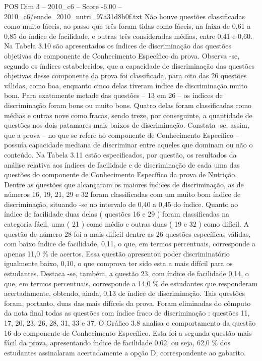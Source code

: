 \begin{textsample}{POS Dim 3 – 2010\_c6 – Score -6.00 – 2010\_c6/enade\_2010\_nutri\_97a31d8b0f.txt}
Não houve questões classificadas como muito fáceis, ao passo que três foram tidas como fáceis, na faixa de 0,61 a 0,85 do índice de facilidade, e outras três consideradas médias, entre 0,41 e 0,60.
Na Tabela 3.10 são apresentados os índices de discriminação das questões objetivas do componente de Conhecimento Específico da prova.
Observa -se, segundo os índices estabelecidos, que a capacidade de discriminação das questões objetivas desse componente da prova foi classificada, para oito das 26 questões válidas, como boa, enquanto cinco delas tiveram índice de discriminação muito bom.
Para exatamente metade das questões – 13 em 26 – os índices de discriminação foram bons ou muito bons.
Quatro delas foram classificadas como médias e outras nove como fracas, sendo treze, por conseguinte, a quantidade de questões nos dois patamares mais baixos de discriminação.
Constata -se, assim, que a prova – no que se refere ao componente de Conhecimento Específico – possuía capacidade mediana de discriminar entre aqueles que dominam ou não o conteúdo.
Na Tabela 3.11 estão especificados, por questão, os resultados da análise relativa aos índices de facilidade e de discriminação de cada uma das questões do componente de Conhecimento Específico da prova de Nutrição.
Dentre as questões que alcançaram os maiores índices de discriminação, as de números 16, 19, 21, 29 e 32 foram classificadas com um muito bom índice de discriminação, situando -se no intervalo de 0,40 a 0,45 do índice.
Quanto ao índice de facilidade duas delas ( questões 16 e 29 ) foram classificadas na categoria fácil, uma ( 21 ) como médio e outras duas ( 19 e 32 ) como difícil.
A questão de número 28 foi a mais difícil dentre as 26 questões específicas válidas, com baixo índice de facilidade, 0,11, o que, em termos percentuais, corresponde a apenas 11,0 \% de acertos.
Essa questão apresentou poder discriminatório igualmente baixo, 0,10, o que comprova ter sido esta a mais difícil para os estudantes.
Destaca -se, também, a questão 23, com índice de facilidade 0,14, o que, em termos percentuais, corresponde a 14,0 \% de estudantes que responderam acertadamente, obtendo, ainda, 0,13 de índice de discriminação.
Tais questões foram, portanto, duas das mais difíceis da prova.
Foram eliminadas do cômputo da nota final todas as questões com índice fraco de discriminação : questões 11, 17, 20, 23, 26, 28, 31, 33 e 37.
O Gráfico 3.8 analisa o comportamento da questão 16 do componente de Conhecimento Específico.
Esta foi a segunda questão mais fácil da prova, apresentando índice de facilidade 0,62, ou seja, 62,0 \% dos estudantes assinalaram acertadamente a opção D, correspondente ao gabarito.

\end{textsample}
